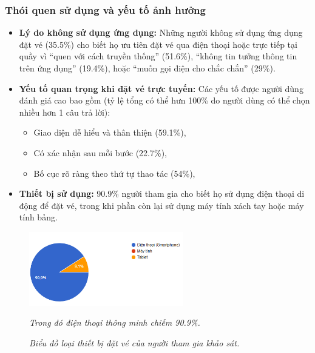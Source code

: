 \subsubsection{Thói quen sử dụng và yếu tố ảnh hưởng}
\begin{itemize}
    \item \textbf{Lý do không sử dụng ứng dụng:} Những người không sử dụng ứng dụng đặt vé (35.5\%) cho biết họ ưu tiên đặt vé qua điện thoại hoặc trực tiếp tại quầy vì ``quen với cách truyền thống'' (51.6\%), ``không tin tưởng thông tin trên ứng dụng'' (19.4\%), hoặc ``muốn gọi điện cho chắc chắn'' (29\%).
    \item \textbf{Yếu tố quan trọng khi đặt vé trực tuyến:} Các yếu tố được người dùng đánh giá cao bao gồm (tỷ lệ tổng có thể hưn 100\%  do người dùng có thể chọn nhiều hơn 1 câu trả lời):
    \begin{itemize}
        \item Giao diện dễ hiểu và thân thiện (59.1\%),
        \item Có xác nhận sau mỗi bước (22.7\%),
        \item Bố cục rõ ràng theo thứ tự thao tác (54\%),
    \end{itemize}
    \item \textbf{Thiết bị sử dụng:} 90.9\% người tham gia cho biết họ sử dụng điện thoại di động để đặt vé, trong khi phần còn lại sử dụng máy tính xách tay hoặc máy tính bảng.
\end{itemize}

    \begin{figure}[h]
    \centering
    \includegraphics[width=0.6\textwidth]{assets/chart/1.4.8.png}
    \caption{\textit{Biểu đồ loại thiết bị đặt vé của người tham gia khảo sát.}} \textit{Trong đó điện thoại thông minh chiếm 90.9\%.}
    \label{fig:muc_xep_hang}
\end{figure}

